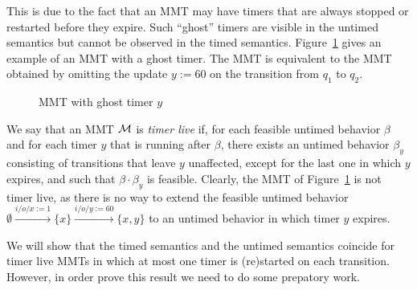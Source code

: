 This is due to the fact that an MMT may have timers that are always stopped or restarted before
they expire. Such ``ghost'' timers are visible in the untimed semantics but cannot be observed in the timed semantics.
\iflong
Figure~\ref{fig:ghosttimers} gives an example of an MMT with a ghost timer. The MMT is equivalent to the MMT obtained by 
omitting the update $y :=60$ on the transition from $q_1$ to $q_2$.
\begin{figure}
\begin{center}
\caption{MMT with ghost timer $y$}
\label{fig:ghosttimers}
\end{center}
\end{figure}
\fi
%
We say that an MMT ${\mathcal M}$ is \emph{timer live} if, for each feasible untimed behavior $\beta$ and for each timer $y$ that is running after $\beta$, there exists an untimed behavior $\beta_y$ consisting of transitions that leave $y$ unaffected, except for the last one in which $y$ expires, and such that $\beta \cdot \beta_y$ is feasible.
\iflong
Clearly, the MMT of Figure~\ref{fig:ghosttimers} is not timer live, as there is no way to extend the feasible untimed
behavior $\emptyset \xrightarrow{i/o/x:=1 } \{ x\} \xrightarrow{i/o/y:=60 } \{ x, y\}$ to an untimed behavior in which
timer $y$ expires.
\fi

We will show that the timed semantics and the untimed semantics coincide for timer live MMTs in which at most one timer is (re)started on each transition. However, in order prove this result we need to do some prepatory work.

